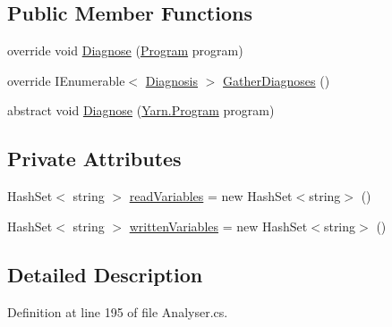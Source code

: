 \subsection*{Public Member Functions}
\begin{DoxyCompactItemize}
\item 
override void \hyperlink{a00187_aeac8f333d4dcc85f4d4a716bf8fea01f}{Diagnose} (\hyperlink{a00154}{Program} program)
\item 
override I\-Enumerable$<$ \hyperlink{a00093}{Diagnosis} $>$ \hyperlink{a00187_a107aecf707b130c4b733930a95f9154e}{Gather\-Diagnoses} ()
\item 
abstract void \hyperlink{a00055_aba4a36cb823b11ee491074e26477d084}{Diagnose} (\hyperlink{a00154}{Yarn.\-Program} program)
\end{DoxyCompactItemize}
\subsection*{Private Attributes}
\begin{DoxyCompactItemize}
\item 
Hash\-Set$<$ string $>$ \hyperlink{a00187_a6b542092ddce1b92c9455d60899518a9}{read\-Variables} = new Hash\-Set$<$string$>$ ()
\item 
Hash\-Set$<$ string $>$ \hyperlink{a00187_a0c2fe6eded1b10b135ca2469f5980a39}{written\-Variables} = new Hash\-Set$<$string$>$ ()
\end{DoxyCompactItemize}


\subsection{Detailed Description}


Definition at line 195 of file Analyser.\-cs.



